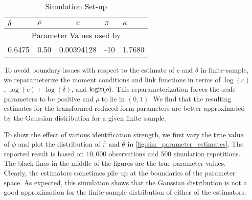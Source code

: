 \begin{table}[htb]
 
 \centering
 \caption{Simulation Set-up}
 \label{tbl:simulationParameters}
 
 \begin{tabularx}{.75\textwidth}{X X c X X}

  \toprule
  $\delta$ & $\rho$ & $c$ & $\pi$ & $\kappa$ \\
  \midrule
  \multicolumn{5}{c}{Parameter Values used by \textcite{han2018leverage}} \\
  \midrule
  0.6475  & 0.50  & \num[scientific-notation=true]{.00394128} & -10 & 1.7680 \\
  \bottomrule
%
 \end{tabularx}

\end{table}

 
To avoid boundary issues with respect to the estimate of $c$ and $\delta$ in finite-sample, we reparameterize the moment conditions and link functions in terms of $\log(c)$,  $\log(c) + \log(\delta)$, and $\operatorname*{logit}(\rho)$. This reparameterization forces the scale parameters to be positive and $\rho$ to lie in $(0,1)$. We find that the resulting estimates for the transformed reduced-form parameters are better approximated by the Gaussian distribution for a given finite sample. 

To show the effect of various identification strength, we first vary the true value of $\phi$ and plot the distribution of $\widehat{\pi}$ and $\widehat{\theta}$ in \cref{fig:sim_parameter_estimates}. The reported result is based on $10,000$  observations and \num{500} simulation repetitions. The black lines in the middle of the figures are the true parameter values. Clearly, the estimators sometimes pile up at the boundaries of the parameter space. As expected, this simulation shows that the Gaussian distribution is not a good approximation for the finite-sample distribution of either of the estimators.

